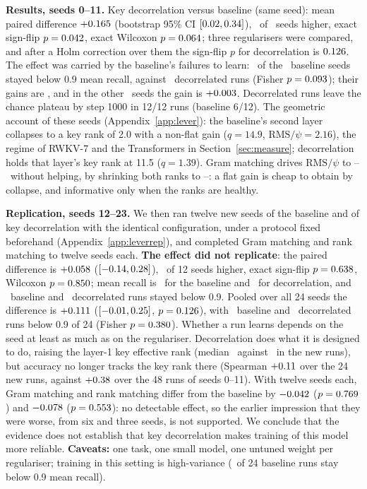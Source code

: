 \documentclass{article}
\begin{document}
\textbf{Results, seeds 0--11.} Key decorrelation versus baseline (same seed): mean paired difference $+0.165$ (bootstrap 95\% CI $[0.02,0.34]$), \mqHigher\ of \mqN\ seeds higher, exact sign-flip $p=0.042$, exact Wilcoxon $p=0.064$; three regularisers were compared, and after a Holm correction over them the sign-flip $p$ for decorrelation is $0.126$. The effect was carried by the baseline's failures to learn: \mqFailBase\ of the \mqN\ baseline seeds stayed below 0.9 mean recall, against \mqFailDec\ decorrelated runs (Fisher $p=0.093$); their gains are \mqFailGains, and in the other \mqNRest\ seeds the gain is $+0.003$. Decorrelated runs leave the chance plateau by step 1000 in 12/12 runs (baseline 6/12). The geometric account of these seeds (Appendix~\ref{app:lever}): the baseline's second layer collapses to a key rank of 2.0 with a non-flat gain ($q=14.9$, $\mathrm{RMS}/\psi=2.16$), the regime of RWKV-7 and the Transformers in Section~\ref{sec:measure}; decorrelation holds that layer's key rank at 11.5 ($q=1.39$). Gram matching drives $\mathrm{RMS}/\psi$ to \gramRmsLo--\gramRmsHi\ without helping, by shrinking both ranks to \gramRankLo--\gramRankHi: a flat gain is cheap to obtain by collapse, and informative only when the ranks are healthy.

\textbf{Replication, seeds 12--23.} We then ran twelve new seeds of the baseline and of key decorrelation with the identical configuration, under a protocol fixed beforehand (Appendix~\ref{app:leverrep}), and completed Gram matching and rank matching to twelve seeds each. \textbf{The effect did not replicate}: the paired difference is $+0.058$ ($[-0.14,0.28]$), \repHigher\ of 12 seeds higher, exact sign-flip $p=0.638$, Wilcoxon $p=0.850$; mean recall is \repBaseMean\ for the baseline and \repDecMean\ for decorrelation, and \repFailBase\ baseline and \repFailDec\ decorrelated runs stayed below 0.9. Pooled over all 24 seeds the difference is $+0.111$ ($[-0.01,0.25]$, $p=0.126$), with \poolFailBase\ baseline and \poolFailDec\ decorrelated runs below 0.9 of 24 (Fisher $p=0.380$). Whether a run learns depends on the seed at least as much as on the regulariser. Decorrelation does what it is designed to do, raising the layer-1 key effective rank (median \mqNewKeyDec\ against \mqNewKeyBase\ in the new runs), but accuracy no longer tracks the key rank there (Spearman $+0.11$ over the 24 new runs, against $+0.38$ over the 48 runs of seeds 0--11). With twelve seeds each, Gram matching and rank matching differ from the baseline by $-0.042$ ($p=0.769$) and $-0.078$ ($p=0.553$): no detectable effect, so the earlier impression that they were worse, from six and three seeds, is not supported. We conclude that the evidence does not establish that key decorrelation makes training of this model more reliable. \textbf{Caveats:} one task, one small model, one untuned weight per regulariser; training in this setting is high-variance (\poolFailBase\ of 24 baseline runs stay below 0.9 mean recall).
\end{document}
